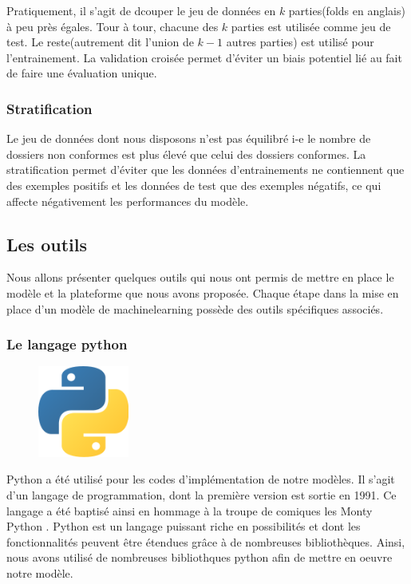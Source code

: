       Pratiquement, il s'agit de dcouper le jeu de données en $k$ parties(folds
      en anglais) à peu près égales. Tour à tour, chacune des $k$ parties est
      utilisée comme jeu de test. Le reste(autrement dit l'union de $k-1$ autres
      parties) est utilisé pour l'entrainement.
      La validation croisée permet d'éviter un biais potentiel lié au fait de
      faire une évaluation unique.

      \subsubsection{Stratification}


    Le jeu de données dont nous disposons n'est pas équilibré i-e le nombre de
    dossiers non conformes est plus élevé que celui des dossiers conformes. La
    stratification permet d'éviter que les données d'entrainements ne
    contiennent que des exemples positifs et les données de test que des
    exemples négatifs, ce qui affecte négativement les performances du modèle.


\subsection{Les outils}
Nous allons présenter quelques outils qui nous ont permis de mettre en place
le modèle et la plateforme que nous avons proposée. Chaque étape dans la
mise en place d'un modèle de machinelearning possède des outils spécifiques
associés.
\subsubsection{Le langage python}
\begin{figure}
  \vspace{-7mm}
  \includegraphics[width=3cm]{images/python.png}
\end{figure}

Python a été utilisé pour les codes d'implémentation de notre
modèles. Il s'agit d'un langage de programmation, dont la première version 
est sortie en 1991. Ce langage a été baptisé ainsi en hommage à la troupe de
comiques les \og Monty Python \og.
Python est un langage puissant riche en possibilités et dont les fonctionnalités
peuvent être étendues grâce à de nombreuses bibliothèques. Ainsi, nous avons
utilisé de nombreuses bibliothques python afin de mettre en oeuvre notre modèle.

